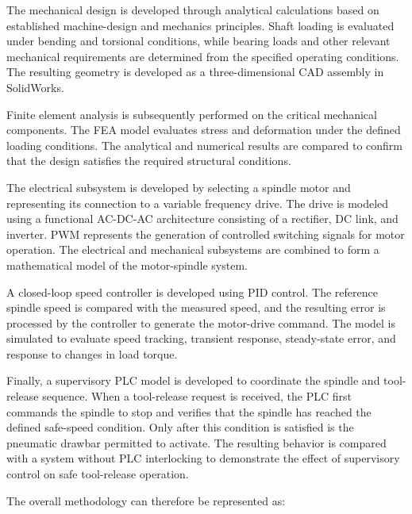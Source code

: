 \documentclass[12pt,a4paper]{report}
\begin{document}
	The mechanical design is developed through analytical calculations based on established machine-design and mechanics principles. Shaft loading is evaluated under bending and torsional conditions, while bearing loads and other relevant mechanical requirements are determined from the specified operating conditions. The resulting geometry is developed as a three-dimensional CAD assembly in SolidWorks.
	
	Finite element analysis is subsequently performed on the critical mechanical components. The FEA model evaluates stress and deformation under the defined loading conditions. The analytical and numerical results are compared to confirm that the design satisfies the required structural conditions.
	
	The electrical subsystem is developed by selecting a spindle motor and representing its connection to a variable frequency drive. The drive is modeled using a functional AC-DC-AC architecture consisting of a rectifier, DC link, and inverter. PWM represents the generation of controlled switching signals for motor operation. The electrical and mechanical subsystems are combined to form a mathematical model of the motor-spindle system.
	
	A closed-loop speed controller is developed using PID control. The reference spindle speed is compared with the measured speed, and the resulting error is processed by the controller to generate the motor-drive command. The model is simulated to evaluate speed tracking, transient response, steady-state error, and response to changes in load torque.
	
	Finally, a supervisory PLC model is developed to coordinate the spindle and tool-release sequence. When a tool-release request is received, the PLC first commands the spindle to stop and verifies that the spindle has reached the defined safe-speed condition. Only after this condition is satisfied is the pneumatic drawbar permitted to activate. The resulting behavior is compared with a system without PLC interlocking to demonstrate the effect of supervisory control on safe tool-release operation.
	
	The overall methodology can therefore be represented as:
	
\end{document}
